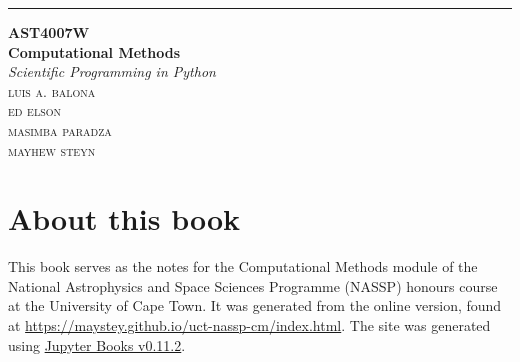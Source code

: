 \begin{titlepage} %
	
	\raggedleft %
	
	\rule{1pt}{\textheight} %
	\hspace{0.05\textwidth} %
	\parbox[b]{0.75\textwidth}{ %
		
		{\Huge\bfseries AST4007W} \\[0.5\baselineskip]
		{\Huge\bfseries Computational Methods}
		\\[2\baselineskip] %
		{\large\textit{Scientific Programming in Python}}\\[4\baselineskip] %
		{\Large\textsc{luis a. balona\\ ed elson\\ masimba paradza\\ mayhew steyn}} %
		
		\vspace{0.5\textheight} %
		
	}

\end{titlepage}


\section*{About this book}

This book serves as the notes for the Computational Methods module of the National Astrophysics and Space Sciences Programme (NASSP) honours course at the University of Cape Town. It was generated from the online version, found at \url{https://maystey.github.io/uct-nassp-cm/index.html}. The site was generated using \href{https://jupyterbook.org/intro.html}{Jupyter Books v0.11.2}.\\

